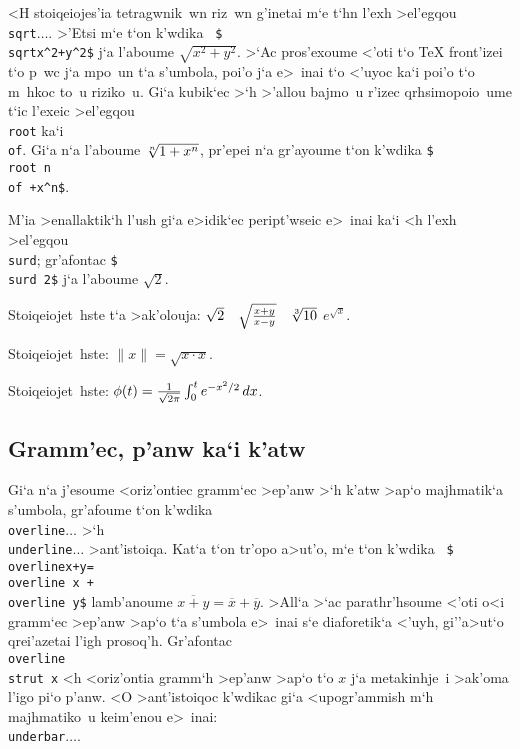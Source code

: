 <H stoiqeiojes'ia tetragwnik~wn riz~wn g'inetai m`e t`hn l'exh >el'egqou
{\tt \\sqrt\lb$\ldots$\rb}\null. >'Etsi m`e t`on k'wdika {\tt
\$\\sqrt\lb x\^{}2+y\^{}2\rb\$} j`a l'aboume $\sqrt{x^2+y^2}$\null. 
>`Ac pros'exoume <'oti t`o {\rm \TeX} front'izei t`o p~wc j`a mpo~un t`a
s'umbola, poi'o j`a e>~inai t`o <'uyoc ka`i poi'o t`o m~hkoc to~u
riziko~u.  Gi`a kubik`ec >`h >'allou bajmo~u r'izec qrhsimopoio~ume t`ic
l'exeic >el'egqou {\tt \\root} ka`i {\tt \\of}.  Gi`a n`a l'aboume
$\root n \of {1+x^n}$, pr'epei n`a gr'ayoume t`on k'wdika {\tt \$\\root
n \\of {}+x\^{}n\rb\$}.%

M'ia >enallaktik`h l'ush gi`a e>idik`ec peript'wseic e>~inai ka`i <h
l'exh >el'egqou {\tt \\surd}; gr'afo\-ntac {\tt \$\\surd 2\$} j`a
l'aboume $\surd 2$.

\exercise Stoiqeiojet~hste t`a >ak'olouja: $\sqrt2 \quad \sqrt {x+y\over
x-y} \quad \root 3 \of {10}$ \quad $e^{\sqrt x}$.

\exercise Stoiqeiojet~hste: $\|x\| = \sqrt{x\cdot x}$.

\exercise Stoiqeiojet~hste: $\phi(t) = {1 \over \sqrt{2\pi}} \int_0^t
e^{-x^2/2}\,dx$.

\subsection{Gramm'ec, p'anw ka`i k'atw}
                 
Gi`a n`a j'esoume <oriz'ontiec gramm`ec >ep'anw >`h k'atw >ap`o 
majhmatik`a s'umbola, gr'afoume t`on k'wdika {\tt
\\overline\lb$\ldots$\rb} >`h {\tt \\underline\lb$\ldots$\rb}
>ant'istoiqa. Kat`a t`on tr'opo a>ut'o, m`e t`on k'wdika {\tt
\$\\overline\lb x+y\rb=\\overline x + \\overline y\$} lamb'anoume
$\overline{x+y}=\overline x + \overline y$\null. >All`a >`ac
parathr'hsoume <'oti o<i gramm`ec >ep'anw >ap`o t`a s'umbola e>~inai s`e
diaforetik`a <'uyh, gi''\NB{}a>ut`o qrei'azetai l'igh prosoq'h. 
Gr'afontac {\tt \\overline\lb\\strut x\rb} <h <oriz'ontia gramm`h
>ep'anw >ap`o t`o $x$ j`a metakinhje~i >ak'oma l'igo pi`o
p'anw. <O
>ant'istoiqoc k'w\-di\-kac gi`a <upogr'ammish m`h majh\-mati\-ko~u
keim'enou e>~inai: {\tt \\underbar\lb$\dots$\rb}.

